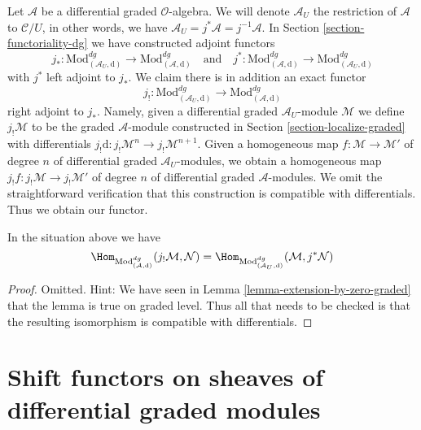 \medskip\noindent
Let $\mathcal{A}$ be a differential graded $\mathcal{O}$-algebra.
We will denote $\mathcal{A}_U$ the restriction of $\mathcal{A}$
to $\mathcal{C}/U$, in other words, we have
$\mathcal{A}_U = j^*\mathcal{A} = j^{-1}\mathcal{A}$.
In Section \ref{section-functoriality-dg}
we have constructed adjoint functors
$$
j_* :
\text{Mod}^{dg}_{(\mathcal{A}_U, \text{d})}
\longrightarrow
\text{Mod}^{dg}_{(\mathcal{A}, \text{d})}
\quad\text{and}\quad
j^* :
\text{Mod}^{dg}_{(\mathcal{A}, \text{d})}
\longrightarrow
\text{Mod}^{dg}_{(\mathcal{A}_U, \text{d})}
$$
with $j^*$ left adjoint to $j_*$. We claim there is in addition an
exact functor
$$
j_! :
\text{Mod}^{dg}_{(\mathcal{A}_U, \text{d})}
\longrightarrow
\text{Mod}^{dg}_{(\mathcal{A}, \text{d})}
$$
right adjoint to $j_*$. Namely, given a differential graded
$\mathcal{A}_U$-module $\mathcal{M}$ we define $j_!\mathcal{M}$
to be the graded $\mathcal{A}$-module constructed in
Section \ref{section-localize-graded}
with differentials
$j_!\text{d} : j_!\mathcal{M}^n \to j_!\mathcal{M}^{n + 1}$.
Given a homogeneous map
$f : \mathcal{M} \to \mathcal{M}'$ of degree $n$ of differential graded
$\mathcal{A}_U$-modules, we obtain a homogeneous map
$j_!f : j_!\mathcal{M} \to j_!\mathcal{M}'$ of degree $n$
of differential graded $\mathcal{A}$-modules. We omit the
straightforward verification
that this construction is compatible with differentials.
Thus we obtain our functor.

\begin{lemma}
\label{lemma-extension-by-zero-dg}
In the situation above we have
$$
\Hom_{\text{Mod}_{(\mathcal{A}, \text{d})}^{dg}}(
j_!\mathcal{M}, \mathcal{N}) =
\Hom_{\text{Mod}_{(\mathcal{A}_U, \text{d})}^{dg}}(
\mathcal{M}, j^*\mathcal{N})
$$
\end{lemma}

\begin{proof}
Omitted. Hint: We have seen in Lemma \ref{lemma-extension-by-zero-graded}
that the lemma is true on graded level. Thus all that needs to be
checked is that the resulting isomorphism is compatible with differentials.
\end{proof}









\section{Shift functors on sheaves of differential graded modules}
\label{section-shift-dg}

